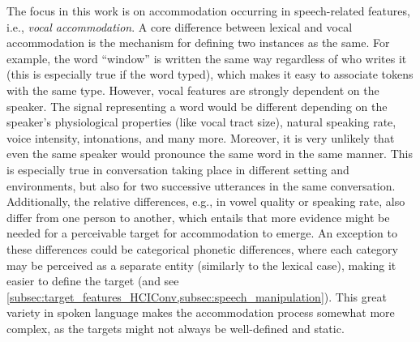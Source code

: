 The focus in this work is on accommodation occurring in speech-related features, i.e., \emph{vocal accommodation}.
A core difference between lexical and vocal accommodation is the mechanism for defining two instances as the same.
For example, the word \enquote{window} is written the same way regardless of who writes it (this is especially true if the word typed), which makes it easy to associate tokens with the same type.
However, vocal features are strongly dependent on the speaker.
The signal representing a word would be different depending on the speaker's physiological properties (like vocal tract size), natural speaking rate, voice intensity, intonations, and many more.
Moreover, it is very unlikely that even the same speaker would pronounce the same word in the same manner.
This is especially true in conversation taking place in different setting and environments, but also for two successive utterances in the same conversation.
Additionally, the relative differences, e.g., in vowel quality or speaking rate, also differ from one person to another, which entails that more evidence might be needed for a perceivable target for accommodation to emerge.
An exception to these differences could be categorical phonetic differences, where each category may be perceived as a separate entity (similarly to the lexical case), making it easier to define the target (and see \cref{subsec:target_features_HCIConv,subsec:speech_manipulation}).
This great variety in spoken language makes the accommodation process somewhat more complex, as the targets might not always be well-defined and static.

